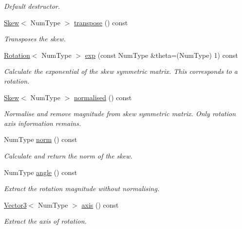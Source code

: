 \begin{DoxyCompactItemize}
\begin{DoxyCompactList}\small\item\em Default destructor. \end{DoxyCompactList}\item 
\hyperlink{singletonscrews_1_1_skew}{Skew}$<$ Num\+Type $>$ \hyperlink{singletonscrews_1_1_skew_a9de36c93d0c6a72986d2258e00e1001f}{transpose} () const 
\begin{DoxyCompactList}\small\item\em Transposes the skew. \end{DoxyCompactList}\item 
\hyperlink{singletonscrews_1_1_rotation}{Rotation}$<$ Num\+Type $>$ \hyperlink{singletonscrews_1_1_skew_aee98d800c4c2aebfaf0a33a519a91969}{exp} (const Num\+Type \&theta=(Num\+Type) 1) const 
\begin{DoxyCompactList}\small\item\em Calculate the exponential of the skew symmetric matrix. This corresponds to a rotation. \end{DoxyCompactList}\item 
\hyperlink{singletonscrews_1_1_skew}{Skew}$<$ Num\+Type $>$ \hyperlink{singletonscrews_1_1_skew_ac4e56e4a13ddbde553d9b519dcdaf284}{normalised} () const 
\begin{DoxyCompactList}\small\item\em Normalise and remove magnitude from skew symmetric matrix. Only rotation axis information remains. \end{DoxyCompactList}\item 
Num\+Type \hyperlink{singletonscrews_1_1_skew_aeca188f486224d8ee823faf6c5f1326a}{norm} () const 
\begin{DoxyCompactList}\small\item\em Calculate and return the norm of the skew. \end{DoxyCompactList}\item 
Num\+Type \hyperlink{singletonscrews_1_1_skew_a193f541e45e6d15fcc5f8937e389fd94}{angle} () const 
\begin{DoxyCompactList}\small\item\em Extract the rotation magnitude without normalising. \end{DoxyCompactList}\item 
\hyperlink{singletonscrews_1_1_translation}{Vector3}$<$ Num\+Type $>$ \hyperlink{singletonscrews_1_1_skew_a833d247e47e08d6e5ce22d4c58edd3f8}{axis} () const 
\begin{DoxyCompactList}\small\item\em Extract the axis of rotation. \end{DoxyCompactList}\item 

\end{DoxyCompactItemize}
